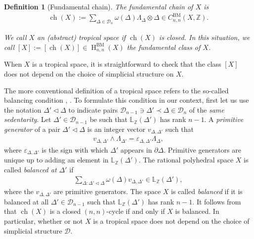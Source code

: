 \documentclass[11pt]{article}
\numberwithin{equation}{numsection}
\newcommand{\ZZ}{{\mathbb Z}}
\newcommand{\Z}{{\mathbb Z}}
\newcommand{\Linear}{\mathbb{L}}
\newcommand{\DD}{\mathcal{D}}
\newcommand{\face}{\lhd}
\DeclareMathOperator{\ch}{ch}
\DeclareMathOperator{\BM}{BM}
\DeclareMathOperator{\HH}{H}
\newtheorem{defn}[thm]{Definition}
\begin{document}
\begin{defn}[Fundamental chain] \label{def fundamental chain} \label{def:fundamentalclass}
The \emph{fundamental chain} of $X$ is 
\begin{align*}
  \ch(X) := \sum \limits_{\Delta \in \DD_n} \omega(\Delta) \Lambda_\Delta \otimes \Delta \in C^{\BM}_{n,n}(X, \ZZ).
\end{align*}

We call $X$ an \emph{(abstract) tropical space} if $\ch(X)$ is closed. 
In this situation, we call $[X] := [\ch(X)] \in \HH_{n,n}^{\BM}(X)$ the \emph{fundamental class} of $X$. 
\end{defn}

When $X$ is a tropical space, it is straightforward to check that the class $[X]$  does not depend on the choice of  simplicial structure  on $X$. 


\begin{rem}{\rm
 The more conventional definition of a tropical space refers to the so-called balancing condition \cite[Definition 3.3.1]{MacStu},
\cite[Section 6.1]{MikRau}. 
To formulate this condition in our context, first let us use 	the notation $\Delta' \face \Delta$ to indicate pairs
$\DD_{n-1} \ni \Delta' \prec \Delta \in \DD_n$ of the  \emph{same sedentarity}.
Let  $\Delta' \in \DD_{n-1}$ be  such that 
$\Linear_{\Z}(\Delta')$ has rank $n-1$. 
A \emph{primitive generator} of a  pair $\Delta' \face \Delta$
is an integer vector $v_{\Delta, \Delta'}$ such that 
\begin{align} \label{eq primitive vector} 
v_{\Delta, \Delta'} \wedge \Lambda_{\Delta'} = \varepsilon_{\Delta, \Delta'} \Lambda_\Delta,
\end{align} 
where $\varepsilon_{\Delta, \Delta'}$ is the sign with which $\Delta'$ appears in $\partial \Delta$.
Primitive generators are unique up to adding an element in $\Linear_{\Z}(\Delta')$.
The rational polyhedral space $X$ is called \emph{balanced at $\Delta'$} if
\begin{align} \label{eq balancing condition} 
\sum_{\Delta : \Delta' \face \Delta} \omega(\Delta) v_{\Delta, \Delta'} \in \Linear_{\Z}(\Delta'),
\end{align} 
where the $v_{\Delta, \Delta'}$ are primitive generators.
The space 	$X$ is called \emph{balanced} if it is balanced at all  $\Delta' \in \DD_{n-1}$ such that $\Linear_{\Z} (\Delta')$ has rank $n-1$.
It follows from \cite[Proposition 4.3]{MikZhar} that $\ch(X)$ is a  closed $(n,n)$-cycle  if and only if $X$ is balanced. 
In particular, whether or not $X$ is a tropical space does not depend on the choice of  simplicial structure $\DD$. }
\end{rem}
\end{document}
